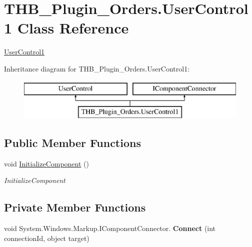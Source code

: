 \hypertarget{class_t_h_b___plugin___orders_1_1_user_control1}{}\section{T\+H\+B\+\_\+\+Plugin\+\_\+\+Orders.\+User\+Control1 Class Reference}
\label{class_t_h_b___plugin___orders_1_1_user_control1}


\mbox{\hyperlink{class_t_h_b___plugin___orders_1_1_user_control1}{User\+Control1}}  


Inheritance diagram for T\+H\+B\+\_\+\+Plugin\+\_\+\+Orders.\+User\+Control1\+:\begin{figure}[H]
\begin{center}
\leavevmode
\includegraphics[height=2.000000cm]{d2/dc6/class_t_h_b___plugin___orders_1_1_user_control1}
\end{center}
\end{figure}
\subsection*{Public Member Functions}
\begin{DoxyCompactItemize}
\item 
void \mbox{\hyperlink{class_t_h_b___plugin___orders_1_1_user_control1_ab6bf9301231de03e2f7bad2f7d436c3f}{Initialize\+Component}} ()
\begin{DoxyCompactList}\small\item\em Initialize\+Component \end{DoxyCompactList}\end{DoxyCompactItemize}
\subsection*{Private Member Functions}
\begin{DoxyCompactItemize}
\item 
\mbox{\label{class_t_h_b___plugin___orders_1_1_user_control1_a96d56e40e84ca08b117dea6b74b5545a}} 
void System.\+Windows.\+Markup.\+I\+Component\+Connector. {\bfseries Connect} (int connection\+Id, object target)
\end{DoxyCompactItemize}
